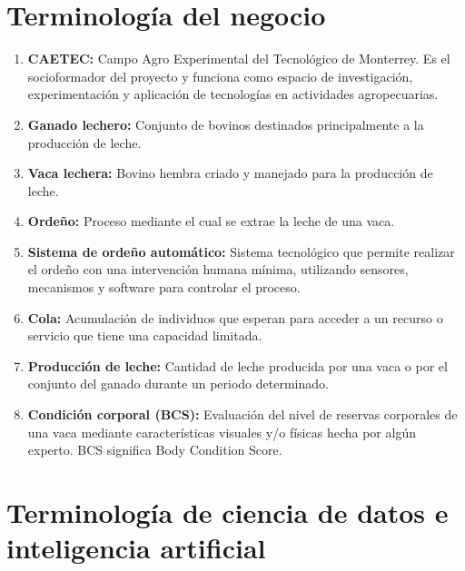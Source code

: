 \documentclass[11pt,letterpaper,DIV=12]{scrartcl}
\begin{document}


\section{Terminología del negocio}

\begin{enumerate}
  \item \textbf{CAETEC:} Campo Agro Experimental del Tecnológico de Monterrey. Es el socioformador del proyecto y funciona como espacio de investigación, experimentación y aplicación de tecnologías en actividades agropecuarias.
  \item \textbf{Ganado lechero:} Conjunto de bovinos destinados principalmente a la producción de leche.
  \item \textbf{Vaca lechera:} Bovino hembra criado y manejado para la producción de leche.
  \item \textbf{Ordeño:} Proceso mediante el cual se extrae la leche de una vaca.
  \item \textbf{Sistema de ordeño automático:} Sistema tecnológico que permite realizar el ordeño con una intervención humana mínima, utilizando sensores, mecanismos y software para controlar el proceso.
  \item \textbf{Cola:} Acumulación de individuos que esperan para acceder a un recurso o servicio que tiene una capacidad limitada.
  \item \textbf{Producción de leche:} Cantidad de leche producida por una vaca o por el conjunto del ganado durante un periodo determinado.
  \item \textbf{Condición corporal (BCS):} Evaluación del nivel de reservas corporales de una vaca mediante características visuales y/o físicas hecha por algún experto. BCS significa Body Condition Score.
\end{enumerate}

\section{Terminología de ciencia de datos e inteligencia artificial}
\end{document}

